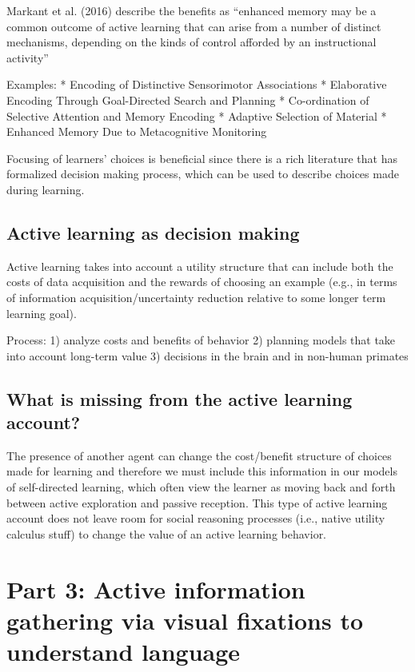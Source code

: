 \documentclass[a4paper,man,apacite,floatsintext]{apa6}
\begin{document}
Markant et al. (2016) describe the benefits as ``enhanced memory may be
a common outcome of active learning that can arise from a number of
distinct mechanisms, depending on the kinds of control afforded by an
instructional activity''

Examples: * Encoding of Distinctive Sensorimotor Associations *
Elaborative Encoding Through Goal-Directed Search and Planning *
Co-ordination of Selective Attention and Memory Encoding * Adaptive
Selection of Material * Enhanced Memory Due to Metacognitive Monitoring

Focusing of learners' choices is beneficial since there is a rich
literature that has formalized decision making process, which can be
used to describe choices made during learning.

\subsection{Active learning as decision
making}\label{active-learning-as-decision-making}

Active learning takes into account a utility structure that can include
both the costs of data acquisition and the rewards of choosing an
example (e.g., in terms of information acquisition/uncertainty reduction
relative to some longer term learning goal).

Process: 1) analyze costs and benefits of behavior 2) planning models
that take into account long-term value 3) decisions in the brain and in
non-human primates

\subsection{What is missing from the active learning
account?}\label{what-is-missing-from-the-active-learning-account}

The presence of another agent can change the cost/benefit structure of
choices made for learning and therefore we must include this information
in our models of self-directed learning, which often view the learner as
moving back and forth between active exploration and passive reception.
This type of active learning account does not leave room for social
reasoning processes (i.e., native utility calculus stuff) to change the
value of an active learning behavior.

\section{Part 3: Active information gathering via visual fixations to
understand
language}\label{part-3-active-information-gathering-via-visual-fixations-to-understand-language}
\end{document}
